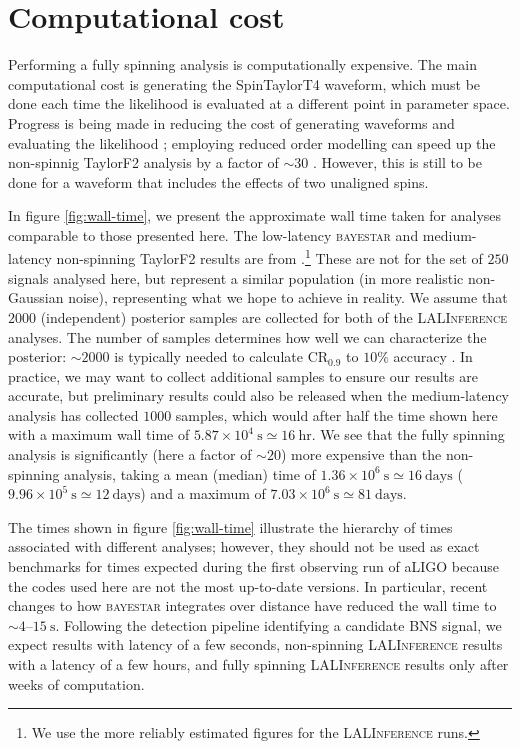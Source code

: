 \appendix

\section{Computational cost}\label{ap:CPU}

Performing a fully spinning analysis is computationally expensive. The main computational cost is generating the SpinTaylorT4 waveform, which must be done each time the likelihood is evaluated at a different point in parameter space. Progress is being made in reducing the cost of generating waveforms and evaluating the likelihood \citep[e.g.,][]{Canizares_2013,P_rrer_2014}; employing reduced order modelling can speed up the non-spinnig TaylorF2 analysis by a factor of $\sim 30$ \citep{Canizares_2015}. However, this is still to be done for a waveform that includes the effects of two unaligned spins.

In figure \ref{fig:wall-time}, we present the approximate wall time taken for analyses comparable to those presented here. The low-latency \textsc{bayestar} and medium-latency non-spinning TaylorF2 results are from \citet{Berry_2014}.\footnote{We use the more reliably estimated figures for the \textsc{LALInference} runs.} These are not for the set of $250$ signals analysed here, but represent a similar population (in more realistic non-Gaussian noise), representing what we hope to achieve in reality. We assume that $2000$ (independent) posterior samples are collected for both of the \textsc{LALInference} analyses. The number of samples determines how well we can characterize the posterior: $\sim2000$ is typically needed to calculate $\mathrm{CR}_{0.9}$ to $10\%$ accuracy \citep{DelPozzo_2015}. In practice, we may want to collect additional samples to ensure our results are accurate, but preliminary results could also be released when the medium-latency analysis has collected $1000$ samples, which would after half the time shown here with a maximum wall time of $5.87\times10^4~\mathrm{s} \simeq 16~\mathrm{hr}$. We see that the fully spinning analysis is significantly (here a factor of $\sim20$) more expensive than the non-spinning analysis, taking a mean (median) time of $1.36\times10^6~\mathrm{s} \simeq 16~\mathrm{days}$ ($9.96\times10^5~\mathrm{s} \simeq 12~\mathrm{days}$) and a maximum of $7.03\times10^6~\mathrm{s} \simeq 81~\mathrm{days}$.

The times shown in figure \ref{fig:wall-time} illustrate the hierarchy of times associated with different analyses; however, they should not be used as exact benchmarks for times expected during the first observing run of aLIGO because the codes used here are not the most up-to-date versions. In particular, recent changes to how \textsc{bayestar} integrates over distance have reduced the wall time to $\sim 4$--$15~\mathrm{s}$. Following the detection pipeline identifying a candidate BNS signal, we expect  results with latency of a few seconds, non-spinning \textsc{LALInference} results with a latency of a few hours, and fully spinning \textsc{LALInference} results only after weeks of computation. 


